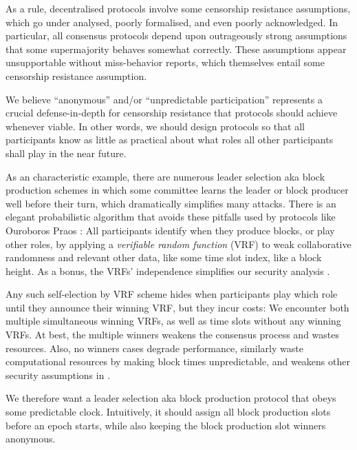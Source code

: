 

As a rule, decentralised protocols involve some censorship resistance assumptions, which go under analysed, poorly formalised, and even poorly acknowledged.  In particular, all consensus protocols depend upon outrageously strong assumptions that some supermajority behaves somewhat correctly.  These assumptions appear unsupportable without miss-behavior reports, which themselves entail some censorship resistance assumption. 

We believe ``anonymous'' and/or ``unpredictable participation'' represents a crucial defense-in-depth for censorship resistance that protocols should achieve whenever viable.  In other words, we should design protocols so that all participants know as little as practical about what roles all other participants shall play in the near future. 

As an characteristic example, there are numerous leader selection aka block production schemes in which some committee learns the leader or block producer well before their turn, which dramatically simplifies many attacks.  There is an elegant probabilistic algorithm that avoids these pitfalls used by protocols like Ouroboros Praos \cite{Praos}:  All participants identify when they produce blocks, or play other roles, by applying a {\em verifiable random function} (VRF) to weak collaborative randomness and relevant other data, like some time slot index, like a block height.  As a bonus, the VRFs' independence simplifies our security analysis \cite{Kiffer18}.

Any such self-election by VRF scheme hides when participants play which role until they announce their winning VRF, but they incur costs:  We encounter both multiple simultaneous winning VRFs, as well as time slots without any winning VRFs.  At best, the multiple winners weakens the consensus process and wastes resources.  Also, no winners cases degrade performance, similarly waste computational resources by making block times unpredictable, and weakens other security assumptions in \cite{Praos,Kiffer18}.

We therefore want a leader selection aka block production protocol that obeys some predictable clock.  Intuitively, it should assign all block production slots before an epoch starts, while also keeping the block production slot winners anonymous.  

